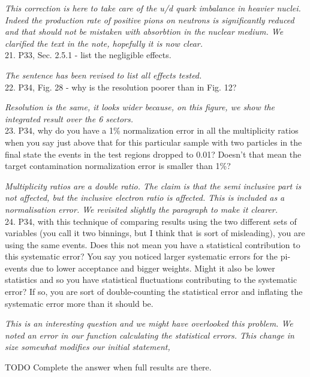 \documentclass[12pt]{article}
\begin{document}
{\it This correction is here to take care of the u/d quark imbalance in heavier nuclei.
Indeed the production rate of positive pions on neutrons is significantly reduced and that
should not be mistaken with absorbtion in the nuclear medium. We clarified the text in the
note, hopefully it is now clear.} \\


21.
P33, Sec. 2.5.1 - list the negligible effects.

{\it The sentence has been revised to list all effects tested. } \\

22.
P34, Fig. 28 - why is the resolution poorer than in Fig. 12?

{\it Resolution is the same, it looks wider because, on this figure, we show the integrated 
result over the 6 sectors.} \\


23.
P34, why do you have a 1\% normalization error in all the multiplicity ratios when you say just 
above that for this particular sample with two particles in the final state the events in the test 
regions dropped to 0.01?  Doesn’t that mean the target contamination normalization error is 
smaller than 1\%?

{\it Multiplicity ratios are a double ratio. The claim is that the semi inclusive part 
is not affected, but the inclusive electron ratio is affected. This is included
as a normalisation error. We revisited slightly the paragraph to make it clearer.} \\


24.
P34, with this technique of comparing results using the two different sets of variables (you 
call it two binnings, but I think that is sort of misleading), you are using the same events.  
Does this not mean you have a statistical contribution to this systematic error?  You say you 
noticed larger systematic errors for the pi- events due to lower acceptance and bigger 
weights.  Might it also be lower statistics and so you have statistical fluctuations contributing 
to the systematic error?  If so, you are sort of double-counting the statistical error and 
inflating the systematic error more than it should be.  

{\it This is an interesting question and we might have overlooked this problem. We noted an error
in our function calculating the statistical errors. This change in size somewhat
modifies our initial statement, 

TODO Complete the answer when full results are there.} \\
\end{document}
